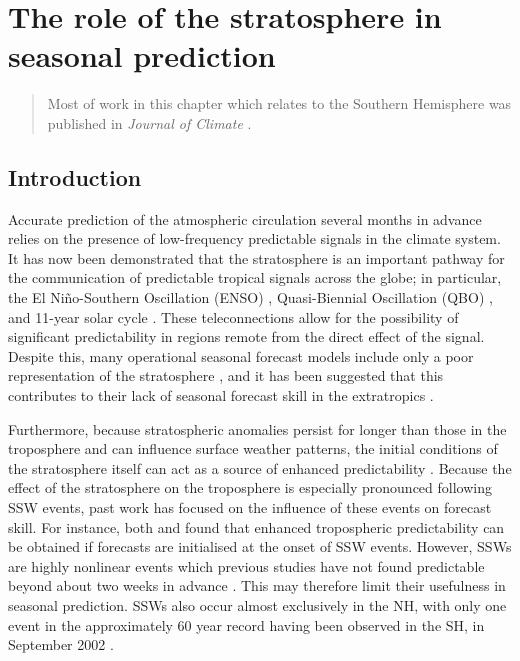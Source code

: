 \chapter{The role of the stratosphere in seasonal prediction}
\label{cha:seas}

\begin{quotation}
  Most of work in this chapter which relates to the Southern Hemisphere was
  published in \emph{Journal of Climate} \citep{Seviour2014}.
\end{quotation}


\section{Introduction}
\label{sec:seas-introduction}

Accurate prediction of the atmospheric circulation several months in advance
relies on the presence of low-frequency predictable signals in the climate
system. It has now been demonstrated that the stratosphere is an important
pathway for the communication of predictable tropical signals across the globe;
in particular, the El Ni\~no-Southern Oscillation (ENSO) \citep{Bell2009,
  Ineson2009, Hurwitz2011}, Quasi-Biennial Oscillation (QBO)
\citep{Marshall2009, Garfinkel2011}, and 11-year solar cycle \citep{Haigh2003,
  Gray2013}. These teleconnections allow for the possibility of significant
predictability in regions remote from the direct effect of the signal. Despite
this, many operational seasonal forecast models include only a poor
representation of the stratosphere \citep{Maycock2011}, and it has been
suggested that this contributes to their lack of seasonal forecast skill in the
extratropics \citep{Smith2012}.

Furthermore, because stratospheric anomalies persist for longer than those in
the troposphere and can influence surface weather patterns, the initial
conditions of the stratosphere itself can act as a source of enhanced
predictability \citep{Baldwin2003a, Charlton2003, Christiansen2005,
  Hardiman2011}. Because the effect of the stratosphere on the troposphere is
especially pronounced following SSW events, past work has focused on the
influence of these events on forecast skill. For instance, both
\citet{Kuroda2008} and \citet{Sigmond2013} found that enhanced tropospheric
predictability can be obtained if forecasts are initialised at the onset of SSW
events. However, SSWs are highly nonlinear events which previous studies have
not found predictable beyond about two weeks in advance
\citep{Marshall2010,Taguchi2014}. This may therefore limit their usefulness in
seasonal prediction. SSWs also occur almost exclusively in the NH, with only one
event in the approximately 60 year record having been observed in the SH, in
September 2002 \citep{Roscoe2005}.

